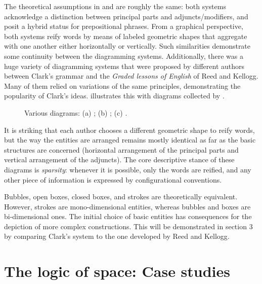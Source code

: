 \documentclass[output=paper]{langsci/langscibook}
\begin{document}
The theoretical assumptions in \citet{clark_science_1847} and \citet{reed_graded_1879} are roughly the same: both systems acknowledge a distinction between principal parts and adjuncts/modifiers, and posit a hybrid status for prepositional phrases. From a graphical perspective, both systems reify words by means of labeled geometric shapes that aggregate with one another either horizontally or vertically. Such similarities demonstrate some continuity between the diagramming systems. Additionally, there was a huge variety of diagramming systems that were proposed by different authors between Clark’s grammar and the \textit{Graded lessons of English} of Reed and Kellogg. Many of them relied on variations of the same principles, demonstrating the popularity of Clark’s ideas.  illustrates this with diagrams collected by \citet{brittain_critical_1973}.

\begin{figure}
    \caption{Various diagrams: (a) \citet[265]{burtt_practical_1869}; (b) \citet[153]{chandler__class_1862}; (c) \citet[50]{lighthall_introduction_1872}.}
    \label{fig:4}
 \end{figure}

It is striking that each author chooses a different geometric shape to reify words, but the way the entities are arranged remains mostly identical as far as the basic structures are concerned (horizontal arrangement of the principal parts and vertical arrangement of the adjuncts). The core descriptive stance of these diagrams is \textit{sparsity}: whenever it is possible, only the words are reified, and any other piece of information is expressed by configurational conventions.

Bubbles, open boxes, closed boxes, and strokes are theoretically equivalent. However, strokes are mono-dimensional entities, whereas bubbles and boxes are bi-dimensional ones. The initial choice of basic entities has consequences for the depiction of more complex constructions. This will be demonstrated in section 3 by comparing Clark’s system to the one developed by Reed and Kellogg.

\section{The logic of space: Case studies}
\end{document}
